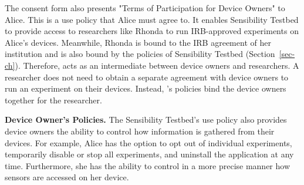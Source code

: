 %
%
%

The consent form also presents "Terms of Participation for Device Owners" to 
Alice. This is a use policy that Alice must agree to. It enables Sensibility Testbed to
provide access to researchers like Rhonda to run IRB-approved experiments on 
Alice's devices. Meanwhile, Rhonda is bound to the IRB agreement of her
institution and is also bound by the policies of Sensibility Testbed (Section~\ref{sec-ch}). 
Therefore, \sysname acts as an intermediate between device owners and 
researchers. A researcher does not need to obtain a separate agreement with
device owners to run an experiment on their devices.  Instead,
\sysname's policies bind the device owners together for the researcher.

\textbf{Device Owner's Policies.}
The Sensibility Testbed's use policy also provides device owners the ability
to control how information is gathered from their devices. For example, 
Alice has the option to opt out of individual experiments, temporarily
disable or stop all experiments, and uninstall the 
application at any time.  Furthermore, 
she has the ability to control in a more precise manner
how sensors are accessed on her device.

